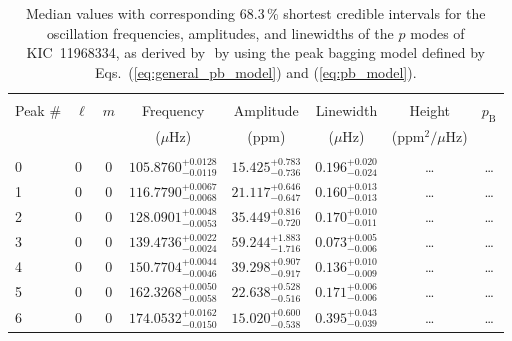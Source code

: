 \begin{table*}[!]
\caption{Median values with corresponding 68.3\,\% shortest credible intervals for the oscillation frequencies, amplitudes, and linewidths of the $p$ modes of KIC~11968334, as derived by \diamonds\,\,by using the peak bagging model defined by Eqs.~(\ref{eq:general_pb_model}) and (\ref{eq:pb_model}).}
\label{tab:11968334p}
\centering
\begin{tabular}{llcrrlrc}
\hline\hline
\\[-8pt]
Peak \# & $\ell$ & $m$ & \multicolumn{1}{c}{Frequency} & \multicolumn{1}{c}{Amplitude} & \multicolumn{1}{c}{Linewidth} & \multicolumn{1}{c}{Height}& $p_\mathrm{B}$\\
 & & & \multicolumn{1}{c}{($\mu$Hz)} & \multicolumn{1}{c}{(ppm)} & \multicolumn{1}{c}{($\mu$Hz)} & \multicolumn{1}{c}{(ppm$^2/\mu$Hz)}\\
\hline \\[-8pt]
0 & 0 & 0 & $    105.8760_{-      0.0119}^{+      0.0128}$ & $      15.425_{-       0.736}^{+       0.783}$ & $       0.196_{-       0.024}^{+       0.020}$ & \multicolumn{1}{c}{\dots} & \dots \\[1pt]
1 & 0 & 0 & $    116.7790_{-      0.0068}^{+      0.0067}$ & $      21.117_{-       0.647}^{+       0.646}$ & $       0.160_{-       0.013}^{+       0.013}$ & \multicolumn{1}{c}{\dots} & \dots \\[1pt]
2 & 0 & 0 & $    128.0901_{-      0.0053}^{+      0.0048}$ & $      35.449_{-       0.720}^{+       0.816}$ & $       0.170_{-       0.011}^{+       0.010}$ & \multicolumn{1}{c}{\dots} & \dots \\[1pt]
3 & 0 & 0 & $    139.4736_{-      0.0024}^{+      0.0022}$ & $      59.244_{-       1.716}^{+       1.883}$ & $       0.073_{-       0.006}^{+       0.005}$ & \multicolumn{1}{c}{\dots} & \dots \\[1pt]
4 & 0 & 0 & $    150.7704_{-      0.0046}^{+      0.0044}$ & $      39.298_{-       0.917}^{+       0.907}$ & $       0.136_{-       0.009}^{+       0.010}$ & \multicolumn{1}{c}{\dots} & \dots \\[1pt]
5 & 0 & 0 & $    162.3268_{-      0.0058}^{+      0.0050}$ & $      22.638_{-       0.516}^{+       0.528}$ & $       0.171_{-       0.006}^{+       0.006}$ & \multicolumn{1}{c}{\dots} & \dots \\[1pt]
6 & 0 & 0 & $    174.0532_{-      0.0150}^{+      0.0162}$ & $      15.020_{-       0.538}^{+       0.600}$ & $       0.395_{-       0.039}^{+       0.043}$ & \multicolumn{1}{c}{\dots} & \dots \\[1pt]

\end{tabular}
\end{table*}
